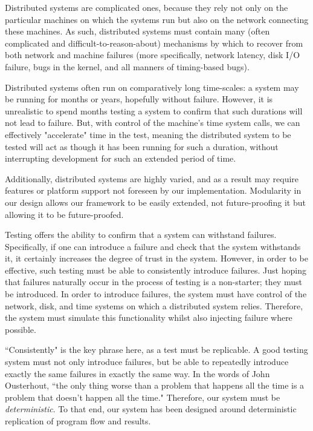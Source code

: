 {\fontsize{12}{15}\selectfont 
Distributed systems are complicated ones,
because they rely not only on the particular machines
on which the systems run but also on the network connecting these machines.
As such, distributed systems must contain many
(often complicated and difficult-to-reason-about)
mechanisms by which to recover from both network and machine failures
(more specifically, network latency, disk I/O failure, bugs in the kernel,
and all manners of timing-based bugs).

Distributed systems often run on comparatively long time-scales:
a system may be running for months or years,
hopefully without failure.
However,
it is unrealistic to spend months testing a system to confirm that such durations will not lead to failure.
But, with control of the machine's time system calls,
we can effectively "accelerate" time in the test,
meaning the distributed system to be tested will act as though it has been running for such a duration,
without interrupting development for such an extended period of time. 

Additionally, distributed systems are highly varied,
and as a result may require features or platform support not foreseen by our implementation.
Modularity in our design allows our framework to be easily extended,
not future-proofing it but allowing it to be future-proofed.

Testing offers the ability to confirm that a system can withstand failures.
Specifically, if one can introduce a failure and check that the system withstands it,
it certainly increases the degree of trust in the system.
However, in order to be effective,
such testing must be able to consistently introduce failures.
Just hoping that failures naturally occur in the process of testing is a non-starter;
they must be introduced.
In order to introduce failures, the system must have control of the network, disk,
and time systems on which a distributed system relies.
Therefore, the system must simulate this functionality whilst also injecting failure where possible.

``Consistently" is the key phrase here,
as a test must be replicable.
A good testing system must not only introduce failures,
but be able to repeatedly introduce exactly the same failures in exactly the same way.
In the words of John Ousterhout,
``the only thing worse than a problem that happens all the time is a problem that doesn't happen all the time."
Therefore, our system must be \textit{deterministic}. To that end, our system has been designed around deterministic replication of program flow and results.

}

